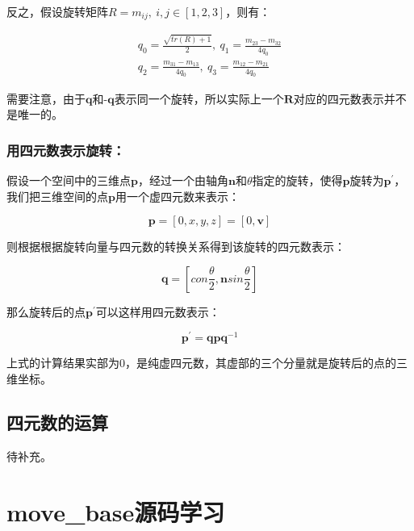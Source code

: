 \documentclass[9pt, oneside]{book}
\begin{document}
反之，假设旋转矩阵$R = {m_{ij}},\ i,j\in [1,2,3]$，则有：

\begin{equation}
    \begin{split}
        q_0 = \frac{\sqrt{tr(R)+1}}{2},\ 
        q_1 = \frac{m_{23}-m_{32}}{4q_0}\\
        q_2 = \frac{m_{31}-m_{13}}{4q_0},\ 
        q_3 = \frac{m_{12}-m_{21}}{4q_0}
    \end{split}
\end{equation}

需要注意，由于$\textbf{q}$和$\textbf{-q}$表示同一个旋转，所以实际上一个$\textbf{R}$对应的四元数表示并不是唯一的。

\subsubsection{用四元数表示旋转：}

假设一个空间中的三维点$\textbf{p}$，经过一个由轴角$\textbf{n}$和$\theta$指定的旋转，使得$\textbf{p}$旋转为$\textbf{p}^\prime$，我们把三维空间的点$\textbf{p}$用一个虚四元数来表示：

\begin{equation}
    \textbf{p} = [0,x,y,z] = [0,\textbf{v}]
\end{equation}

则根据根据旋转向量与四元数的转换关系得到该旋转的四元数表示：

\begin{equation}
    \textbf{q} = [con\frac{\theta}{2},\textbf{n}sin\frac{\theta}{2}]
\end{equation}

那么旋转后的点$\textbf{p}^\prime$可以这样用四元数表示：

\begin{equation}
    \textbf{p}^\prime = \textbf{qpq}^{-1}
\end{equation}

上式的计算结果实部为0，是纯虚四元数，其虚部的三个分量就是旋转后的点的三维坐标。

\subsection{四元数的运算}

待补充。

\section{move\_base源码学习}
\end{document}

